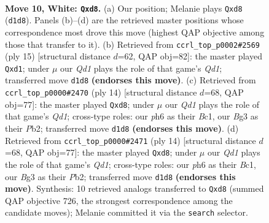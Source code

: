 \documentclass[11pt]{article}
\begin{document}
\clearpage

\begin{figure}[p]\centering
\begin{subfigure}{0.46\textwidth}\centering
\resizebox{\linewidth}{!}{%
\newchessgame
\chessboard[
  setfen={rnbq1rk1/pp2bp2/4pn1p/2P3p1/2p5/2N1PNB1/PP3PPP/R2QKB1R w KQ - 0 10},
  showmover=false,
  pgfstyle=straightmove, color=movearrow, markmove={d1-d8}
]}
\caption{}
\end{subfigure}\hfill
\begin{subfigure}{0.46\textwidth}\centering
\resizebox{\linewidth}{!}{%
\newchessgame
\chessboard[
  setfen={r1bqkb1r/1p3ppp/p1n1pn2/2P5/2B5/4PN1P/PP3PP1/RNBQ1RK1 b kq - 0 8},
  showmover=false,
  pgfstyle=straightmove, color=movearrow, markmove={d8-d1}
]}
\caption{}
\end{subfigure}
\\[4pt]
\begin{subfigure}{0.46\textwidth}\centering
\resizebox{\linewidth}{!}{%
\newchessgame
\chessboard[
  setfen={rnbq1rk1/ppp2pbp/5np1/4p3/2P1P3/2N2N1P/PP3PP1/R1BQKB1R w KQ - 0 8},
  showmover=false,
  pgfstyle=straightmove, color=movearrow, markmove={d1-d8}
]}
\caption{}
\end{subfigure}\hfill
\begin{subfigure}{0.46\textwidth}\centering
\resizebox{\linewidth}{!}{%
\newchessgame
\chessboard[
  setfen={rnbq1rk1/ppp2pbp/5np1/4p3/2P1P3/2N2N1P/PP3PP1/R1BQKB1R w KQ - 0 8},
  showmover=false,
  pgfstyle=straightmove, color=movearrow, markmove={d1-d8}
]}
\caption{}
\end{subfigure}
\caption{\textbf{Move 10, White: \texttt{Qxd8}.} (a) Our position; Melanie plays \texttt{Qxd8} (\texttt{d1d8}). Panels (b)--(d) are the retrieved master positions whose correspondence most drove this move (highest QAP objective among those that transfer to it). (b) Retrieved from \texttt{ccrl\_top\_p0002\#2569} (ply 15) [structural distance $d$=62, QAP obj=82]: the master played \texttt{Qxd1}; under $\mu$ our \emph{Qd1} plays the role of that game's \emph{Qd1}; transferred move \texttt{d1d8} \textbf{(endorses this move)}. (c) Retrieved from \texttt{ccrl\_top\_p0000\#2470} (ply 14) [structural distance $d$=68, QAP obj=77]: the master played \texttt{Qxd8}; under $\mu$ our \emph{Qd1} plays the role of that game's \emph{Qd1}; cross-type roles: our \emph{p}h6 as their \emph{B}c1, our \emph{B}g3 as their \emph{P}b2; transferred move \texttt{d1d8} \textbf{(endorses this move)}. (d) Retrieved from \texttt{ccrl\_top\_p0000\#2471} (ply 14) [structural distance $d$=68, QAP obj=77]: the master played \texttt{Qxd8}; under $\mu$ our \emph{Qd1} plays the role of that game's \emph{Qd1}; cross-type roles: our \emph{p}h6 as their \emph{B}c1, our \emph{B}g3 as their \emph{P}b2; transferred move \texttt{d1d8} \textbf{(endorses this move)}. Synthesis: 10 retrieved analogs transferred to \texttt{Qxd8} (summed QAP objective 726, the strongest correspondence among the candidate moves); Melanie committed it via the \texttt{search} selector.}
\label{fig:thought-m18}
\end{figure}
\end{document}

